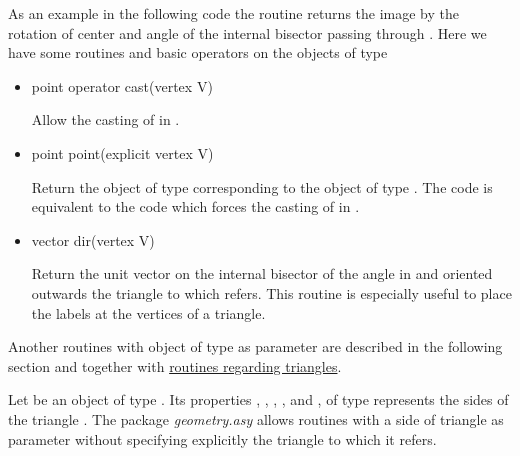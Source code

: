 \documentclass[pdftex]{article}
\newcommand{\Geo}{The package \emph{geometry.asy}\xspace}
\begin{document}
As an example in the following code the routine
\hypertarget{bisectorvertex}{%
  }%
 returns the image by the rotation of
center  and angle  of the internal bisector
passing through .
Here we have some routines and basic operators on the objects of type 
\begin{itemize}
\item {}
  \begin{Vcolor}
    point operator cast(vertex V)
  \end{Vcolor}
  Allow the casting  of   in  .
\item {}
  \begin{Vcolor}
    point point(explicit vertex V)
  \end{Vcolor}
  Return the object of type  corresponding to the
  object  of type . The code  is
  equivalent to the code  which forces the casting of
   in .
\item {}
  \begin{Vcolor}
    vector dir(vertex V)
  \end{Vcolor}
  Return the unit vector on the internal bisector of the angle
  in  and oriented outwards the triangle to which 
  refers. This routine is especially useful to place the labels at the
  vertices of a triangle.
\end{itemize}
Another routines with object of type  as parameter are
described in the following section and together with
\href{#subsection.routines}{routines regarding triangles}.

Let  be an object of type . Its properties
, , , , 
and , of type  represents the sides of the
triangle . \Geo  allows routines with a side of triangle as
parameter without specifying explicitly the triangle to which it refers.
\end{document}
